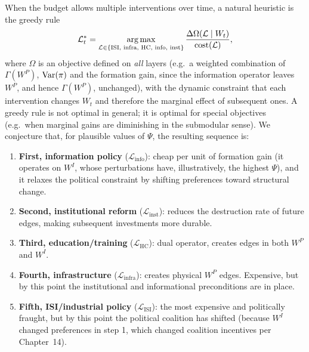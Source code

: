 \documentclass[../structural_economics_book.tex]{subfiles}
\begin{document}
\begin{conjecture}\label{ch15:thm:sequencing}
When the budget allows multiple interventions over time, a natural heuristic is the greedy rule
\begin{equation}\label{ch15:eq:sequencing}
\mathcal{L}^*_t = \operatorname*{arg\,max}_{\mathcal{L} \in \{\text{ISI, infra, HC, info, inst}\}} \frac{\Delta\Omega(\mathcal{L} \mid W_t)}{\text{cost}(\mathcal{L})},
\end{equation}
where $\Omega$ is an objective defined on \emph{all} layers (e.g.\ a weighted combination of $\Gamma(W^P)$, $\operatorname{Var}(\pi)$ and the formation gain, since the information operator leaves $W^P$, and hence $\Gamma(W^P)$, unchanged), with the dynamic constraint that each intervention changes $W_t$ and therefore the marginal effect of subsequent ones. A greedy rule is not optimal in general; it is optimal for special objectives (e.g.\ when marginal gains are diminishing in the submodular sense). We conjecture that, for plausible values of $\Psi$, the resulting sequence is:
\begin{enumerate}
\item \textbf{First, information policy} ($\mathcal{L}_{\text{info}}$): cheap per unit of formation gain (it operates on $W^I$, whose perturbations have, illustratively, the highest $\Psi$), and it relaxes the political constraint by shifting preferences toward structural change.
\item \textbf{Second, institutional reform} ($\mathcal{L}_{\text{inst}}$): reduces the destruction rate of future edges, making subsequent investments more durable.
\item \textbf{Third, education/training} ($\mathcal{L}_{\text{HC}}$): dual operator, creates edges in both $W^P$ and $W^I$.
\item \textbf{Fourth, infrastructure} ($\mathcal{L}_{\text{infra}}$): creates physical $W^P$ edges. Expensive, but by this point the institutional and informational preconditions are in place.
\item \textbf{Fifth, ISI/industrial policy} ($\mathcal{L}_{\text{ISI}}$): the most expensive and politically fraught, but by this point the political coalition has shifted (because $W^I$ changed preferences in step 1, which changed coalition incentives per Chapter~14).
\end{enumerate}
\end{conjecture}
\end{document}
